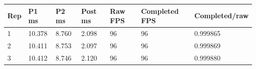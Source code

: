 \begin{tabular}{lllllll}
\hline
Rep & P1 ms & P2 ms & Post ms & Raw FPS & Completed FPS & Completed/raw \\
\hline
1 & 10.378 & 8.760 & 2.098 & 96 & 96 & 0.999865 \\
2 & 10.411 & 8.753 & 2.097 & 96 & 96 & 0.999869 \\
3 & 10.412 & 8.746 & 2.120 & 96 & 96 & 0.999880 \\
\hline
\end{tabular}
